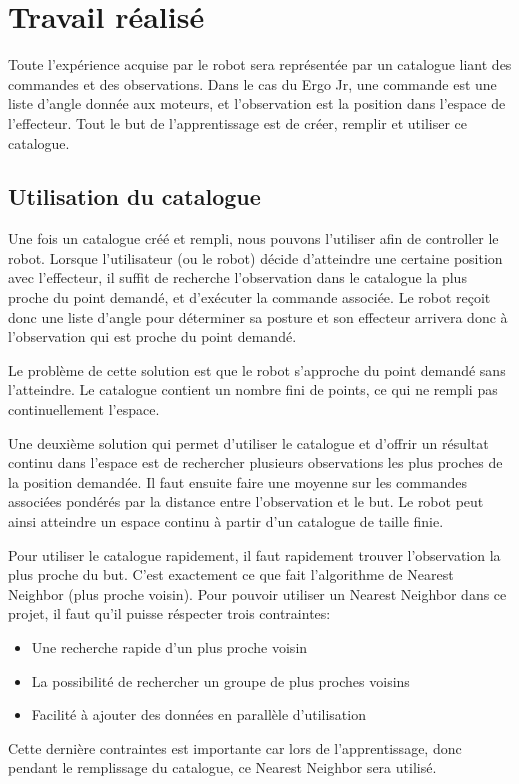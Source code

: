 \documentclass[11pt,french]{report}
\begin{document}
\chapter{Travail réalisé}

Toute l'expérience acquise par le robot sera représentée par un catalogue liant des commandes et des observations.
Dans le cas du Ergo Jr, une commande est une liste d'angle donnée aux moteurs, et l'observation est la position dans l'espace de l'effecteur.
Tout le but de l'apprentissage est de créer, remplir et utiliser ce catalogue.

\section{Utilisation du catalogue}

Une fois un catalogue créé et rempli, nous pouvons l'utiliser afin de controller le robot.
Lorsque l'utilisateur (ou le robot) décide d'atteindre une certaine position avec l'effecteur, il suffit de recherche l'observation dans le catalogue la plus proche du point demandé, et d'exécuter la commande associée.
Le robot reçoit donc une liste d'angle pour déterminer sa posture et son effecteur arrivera donc à l'observation qui est proche du point demandé.

\phantom{INVISIBLE LINE}

Le problème de cette solution est que le robot s'approche du point demandé sans l'atteindre.
Le catalogue contient un nombre fini de points, ce qui ne rempli pas continuellement l'espace.

Une deuxième solution qui permet d'utiliser le catalogue et d'offrir un résultat continu dans l'espace est de rechercher plusieurs observations les plus proches de la position demandée.
Il faut ensuite faire une moyenne sur les commandes associées pondérés par la distance entre l'observation et le but.
Le robot peut ainsi atteindre un espace continu à partir d'un catalogue de taille finie.

\phantom{INVISIBLE LINE}

Pour utiliser le catalogue rapidement, il faut rapidement trouver l'observation la plus proche du but.
C'est exactement ce que fait l'algorithme de Nearest Neighbor (plus proche voisin).
Pour pouvoir utiliser un Nearest Neighbor dans ce projet, il faut qu'il puisse réspecter trois contraintes:
\begin{itemize}
    \item Une recherche rapide d'un plus proche voisin
    \item La possibilité de rechercher un groupe de plus proches voisins
    \item Facilité à ajouter des données en parallèle d'utilisation
\end{itemize}
Cette dernière contraintes est importante car lors de l'apprentissage, donc pendant le remplissage du catalogue, ce Nearest Neighbor sera utilisé.
\end{document}
